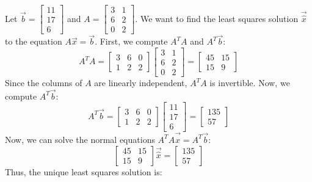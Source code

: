 \begin{eg}
    Let $\vec{b} = \begin{bmatrix}
        11 \\ 17 \\ 6
    \end{bmatrix}$ and $A = \begin{bmatrix}
        3 & 1 \\ 6 & 2 \\ 0 & 2
    \end{bmatrix}$. We want to find the least squares solution $\vec{\hat{x}}$ to the equation $A \vec{x} = \vec{b}$. First, we compute $A^T A$ and $A^T \vec{b}$:
    \[
        A^T A = \begin{bmatrix}
            3 & 6 & 0 \\
            1 & 2 & 2
        \end{bmatrix} \begin{bmatrix}
            3 & 1 \\ 6 & 2 \\ 0 & 2
        \end{bmatrix} = \begin{bmatrix}
            45 & 15 \\ 15 & 9
        \end{bmatrix}
    \]
    Since the columns of $A$ are linearly independent, $A^T A$ is invertible. Now, we compute $A^T \vec{b}$:
    \[
        A^T \vec{b} = \begin{bmatrix}
            3 & 6 & 0 \\
            1 & 2 & 2
        \end{bmatrix} \begin{bmatrix}
            11 \\ 17 \\ 6
        \end{bmatrix} = \begin{bmatrix}
            135 \\ 57
        \end{bmatrix}
    \]
    Now, we can solve the normal equations $A^T A \vec{\hat{x}} = A^T \vec{b}$:
    \[
        \begin{bmatrix}
            45 & 15 \\ 15 & 9
        \end{bmatrix} \vec{\hat{x}} = \begin{bmatrix}
            135 \\ 57
        \end{bmatrix}
    \]
    Thus, the unique least squares solution is:

\end{eg}
